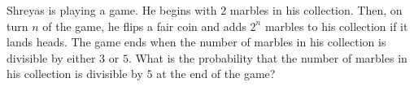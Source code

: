 Shreyas is playing a game. He begins with $2$ marbles in his collection. Then, on turn $n$ of the game, he flips a fair coin and adds $2^n$ marbles to his collection if it lands heads. The game ends when the number of marbles in his collection is divisible by either $3$ or $5$. What is the probability that the number of marbles in his collection is divisible by $5$ at the end of the game?
